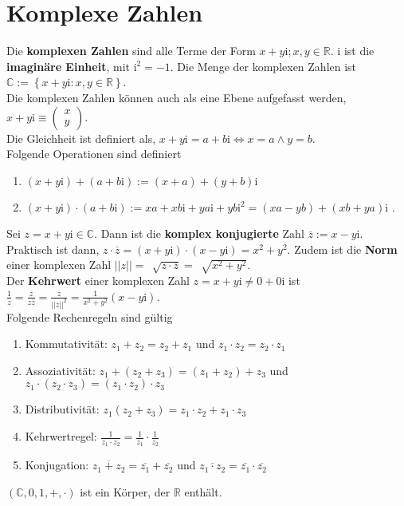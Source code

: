 \documentclass[a4paper,12pt]{article}
\numberwithin{equation}{section}
\begin{document}
\section{Komplexe Zahlen}
Die \textbf{komplexen Zahlen} sind alle Terme der Form $x+y\text{i};x,y \in \mathbb{R}$. $\text{i}$ ist die \textbf{imaginäre Einheit}, mit $\text{i}^2=-1$. Die Menge der komplexen Zahlen ist $\mathbb{C}:=\left\{x+y\text{i}:x,y \in \mathbb{R}\right\}$.\\\indent
Die komplexen Zahlen können auch als eine Ebene aufgefasst werden, $x+y\text{i}\equiv \begin{pmatrix}
        x\\y
\end{pmatrix}$.\\
Die Gleichheit ist definiert als, $x+y\text{i}=a+b\text{i}\Leftrightarrow x=a\land y=b$.\\
Folgende Operationen sind definiert 
\begin{enumerate}[label=--]
        \item $\left(x+y\text{i}\right)+\left(a+b\text{i}\right):=\left(x+a\right)+\left(y+b\right)\text{i}$ 
        \item $\left(x+y\text{i}\right)\cdot \left(a+b\text{i}\right):=xa+xb\text{i}+ya\text{i}+yb\text{i}^2=\left(xa-yb\right)+\left(xb+ya\right)\text{i}$ 
.\end{enumerate}
Sei $z=x+y\text{i} \in \mathbb{C}$.
Dann ist die \textbf{komplex konjugierte} Zahl $\overline{z}:=x-y\text{i}$. Praktisch ist dann, $z\cdot \overline{z}=\left(x+y\text{i}\right)\cdot \left(x-y\text{i}\right)=x^2+y^2$.
Zudem ist die \textbf{Norm} einer komplexen Zahl $| |z| |=\,\sqrt[]{z\cdot \overline{z}}=\,\sqrt[]{x^2+y^2}$.\\\indent
Der \textbf{Kehrwert} einer komplexen Zahl $z=x+y\text{i}\neq 0+0\text{i}$ ist $\tfrac{1}{z}=\tfrac{\overline{z}}{z\overline{z}}=\tfrac{\overline{z}}{| |z| |^2}=\tfrac{1}{x^2+y^2}\left(x-y\text{i}\right)$.\\
Folgende Rechenregeln sind gültig
\begin{enumerate}[label=--]
        \item Kommutativität: $z_1+z_2=z_2+z_1$ und $z_1\cdot z_2=z_2\cdot z_1$ 
        \item Assoziativität: $z_1+\left(z_2+z_3\right)=\left(z_1+z_2\right)+z_3$ und $z_1\cdot \left(z_2\cdot z_3\right)=\left(z_1\cdot z_2\right)\cdot z_3$
        \item Distributivität: $z_1\left(z_2+z_3\right)=z_1\cdot z_2+z_1\cdot z_3$ 
        \item Kehrwertregel: $\tfrac{1}{z_1\cdot z_2}=\tfrac{1}{z_1}\cdot \tfrac{1}{z_2}$ 
        \item Konjugation: $\overline{z_1+z_2}=\overline{z_1}+\overline{z_2}$ und $\overline{z_1\cdot z_2}=\overline{z_1}\cdot \overline{z_2}$ 
\end{enumerate}
$\left(\mathbb{C},0,1,+,\cdot \right)$ ist ein Körper, der $\mathbb{R}$ enthält.
\end{document}
